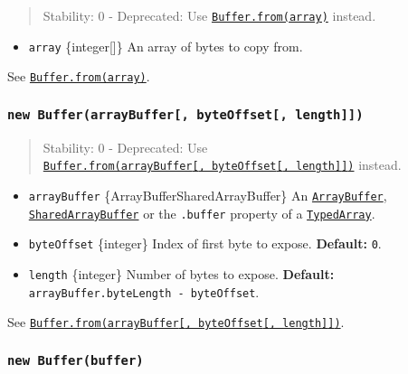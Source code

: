 \begin{quote}
Stability: 0 - Deprecated: Use
\hyperref[static-method-bufferfromarray]{\texttt{Buffer.from(array)}}
instead.
\end{quote}

\begin{itemize}
\tightlist
\item
  \texttt{array} \{integer{[}{]}\} An array of bytes to copy from.
\end{itemize}

See
\hyperref[static-method-bufferfromarray]{\texttt{Buffer.from(array)}}.

\subsubsection{\texorpdfstring{\texttt{new\ Buffer(arrayBuffer{[},\ byteOffset{[},\ length{]}{]})}}{new Buffer(arrayBuffer{[}, byteOffset{[}, length{]}{]})}}\label{new-bufferarraybuffer-byteoffset-length}

\begin{quote}
Stability: 0 - Deprecated: Use
\hyperref[static-method-bufferfromarraybuffer-byteoffset-length]{\texttt{Buffer.from(arrayBuffer{[},\ byteOffset{[},\ length{]}{]})}}
instead.
\end{quote}

\begin{itemize}
\tightlist
\item
  \texttt{arrayBuffer} \{ArrayBuffer\textbar SharedArrayBuffer\} An
  \href{https://developer.mozilla.org/en-US/docs/Web/JavaScript/Reference/Global_Objects/ArrayBuffer}{\texttt{ArrayBuffer}},
  \href{https://developer.mozilla.org/en-US/docs/Web/JavaScript/Reference/Global_Objects/SharedArrayBuffer}{\texttt{SharedArrayBuffer}}
  or the \texttt{.buffer} property of a
  \href{https://developer.mozilla.org/en-US/docs/Web/JavaScript/Reference/Global_Objects/TypedArray}{\texttt{TypedArray}}.
\item
  \texttt{byteOffset} \{integer\} Index of first byte to expose.
  \textbf{Default:} \texttt{0}.
\item
  \texttt{length} \{integer\} Number of bytes to expose.
  \textbf{Default:} \texttt{arrayBuffer.byteLength\ -\ byteOffset}.
\end{itemize}

See
\hyperref[static-method-bufferfromarraybuffer-byteoffset-length]{\texttt{Buffer.from(arrayBuffer{[},\ byteOffset{[},\ length{]}{]})}}.

\subsubsection{\texorpdfstring{\texttt{new\ Buffer(buffer)}}{new Buffer(buffer)}}\label{new-bufferbuffer}

